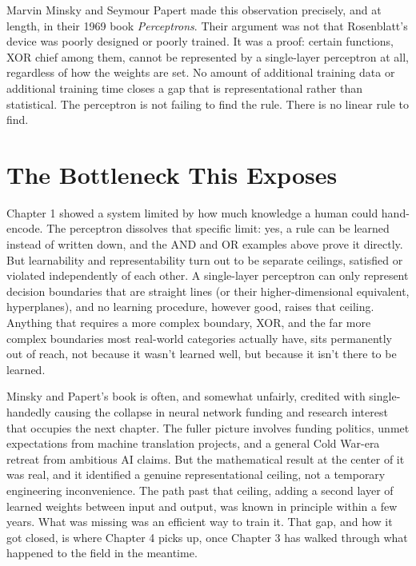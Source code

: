 Marvin Minsky and Seymour Papert made this observation precisely, and at length, in their 1969 book \emph{Perceptrons}. Their argument was not that Rosenblatt's device was poorly designed or poorly trained. It was a proof: certain functions, XOR chief among them, cannot be represented by a single-layer perceptron at all, regardless of how the weights are set. No amount of additional training data or additional training time closes a gap that is representational rather than statistical. The perceptron is not failing to find the rule. There is no linear rule to find.

\section*{The Bottleneck This Exposes}

Chapter 1 showed a system limited by how much knowledge a human could hand-encode. The perceptron dissolves that specific limit: yes, a rule can be learned instead of written down, and the AND and OR examples above prove it directly. But learnability and representability turn out to be separate ceilings, satisfied or violated independently of each other. A single-layer perceptron can only represent decision boundaries that are straight lines (or their higher-dimensional equivalent, hyperplanes), and no learning procedure, however good, raises that ceiling. Anything that requires a more complex boundary, XOR, and the far more complex boundaries most real-world categories actually have, sits permanently out of reach, not because it wasn't learned well, but because it isn't there to be learned.

Minsky and Papert's book is often, and somewhat unfairly, credited with single-handedly causing the collapse in neural network funding and research interest that occupies the next chapter. The fuller picture involves funding politics, unmet expectations from machine translation projects, and a general Cold War-era retreat from ambitious AI claims. But the mathematical result at the center of it was real, and it identified a genuine representational ceiling, not a temporary engineering inconvenience. The path past that ceiling, adding a second layer of learned weights between input and output, was known in principle within a few years. What was missing was an efficient way to train it. That gap, and how it got closed, is where Chapter 4 picks up, once Chapter 3 has walked through what happened to the field in the meantime.
